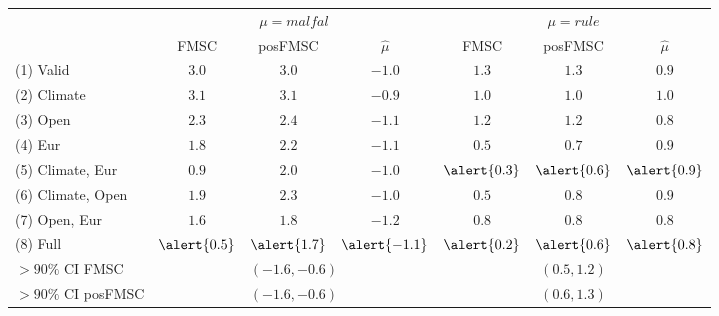 \begin{frame}
\footnotesize
\begin{table}
\centering
	\begin{tabular}{lcccccc}
\hline\hline
 & \multicolumn{3}{c}{$\mu = malfal$}& \multicolumn{3}{c}{$\mu = rule$}\\ 
 & FMSC & posFMSC & $\widehat{\mu}$ & FMSC & posFMSC & $\widehat{\mu}$ \\ 
 \hline
 (1) Valid & $ 3.0$ & $ 3.0$ & $-1.0$ & $1.3$ & $1.3$ & $0.9$\\ 
(2) Climate & $ 3.1$ & $ 3.1$ & $-0.9$ & $1.0$ & $1.0$ & $1.0$\\ 
(3) Open & $ 2.3$ & $ 2.4$ & $-1.1$ & $1.2$ & $1.2$ & $0.8$\\ 
(4) Eur & $ 1.8$ & $ 2.2$ & $-1.1$ & $0.5$ & $0.7$ & $0.9$\\ 
(5) Climate, Eur & $ 0.9$ & $ 2.0$ & $-1.0$ & $\alert{0.3}$ & $\alert{0.6}$ & $\alert{0.9}$\\ 
(6) Climate, Open & $ 1.9$ & $ 2.3$ & $-1.0$ & $0.5$ & $0.8$ & $0.9$\\ 
(7) Open, Eur & $ 1.6$ & $ 1.8$ & $-1.2$ & $0.8$ & $0.8$ & $0.8$\\ 
(8) Full & $\alert{0.5}$ & $\alert{1.7}$ & $\alert{-1.1}$ & $\alert{0.2}$ & $\alert{0.6}$ & $\alert{0.8}$ \\ 
 \hline
 $>90\%$ CI FMSC & \multicolumn{3}{c}{$(-1.6, -0.6)$} & \multicolumn{3}{c}{$(0.5, 1.2)$}\\ 
  $>90\%$ CI posFMSC &   \multicolumn{3}{c}{$(-1.6, -0.6)$} & \multicolumn{3}{c}{$(0.6, 1.3)$}\\ 
  \hline
 \end{tabular}
 \end{table}
\end{frame}

